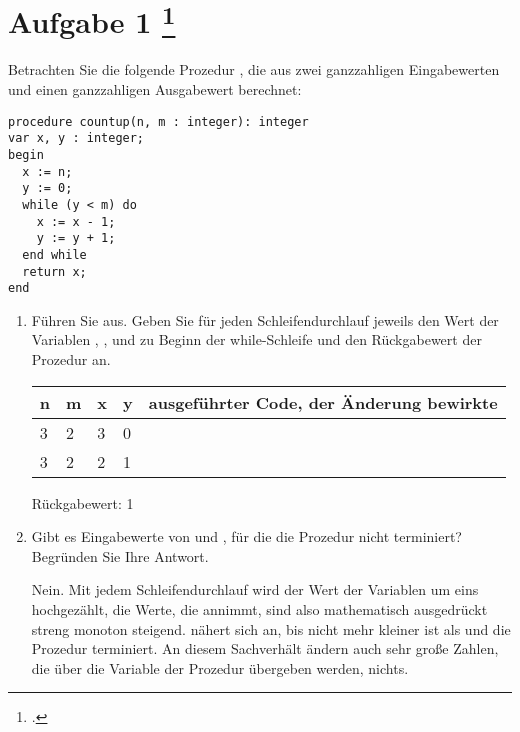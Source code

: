 \documentclass{lehramt-informatik-aufgabe}
\begin{document}

\section{Aufgabe 1
\footcite{66115:2020:09}}

Betrachten Sie die folgende Prozedur , die aus zwei
ganzzahligen Eingabewerten  und  einen ganzzahligen
Ausgabewert berechnet:

\begin{verbatim}
procedure countup(n, m : integer): integer
var x, y : integer;
begin
  x := n;
  y := 0;
  while (y < m) do
    x := x - 1;
    y := y + 1;
  end while
  return x;
end
\end{verbatim}
\begin{enumerate}


\item Führen Sie  aus. Geben Sie für jeden
Schleifendurchlauf jeweils den Wert der Variablen , , 
und  zu Beginn der while-Schleife und den Rückgabewert der Prozedur
an.

\begin{liAntwort}
\begin{tabular}{lllll}
n & m & x & y  & ausgeführter Code, der Änderung bewirkte \\\hline
3 & 2 & 3 & 0 \\
3 & 2 & 2 & 1 & \p{x := x - 1; y := y + 1;} \\
\end{tabular}

Rückgabewert: 1
\end{liAntwort}



\item Gibt es Eingabewerte von  und , für die die Prozedur
 nicht terminiert? Begründen Sie Ihre Antwort.

\begin{liAntwort}
Nein. Mit jedem Schleifendurchlauf wird der Wert der Variablen  um
eins hochgezählt, die Werte, die  annimmt, sind also mathematisch
ausgedrückt streng monoton steigend.  nähert sich 
an, bis  nicht mehr kleiner ist als  und die Prozedur
terminiert. An diesem Sachverhält ändern auch sehr große Zahlen, die
über die Variable  der Prozedur übergeben werden, nichts.
\end{liAntwort}


\end{enumerate}
\end{document}
